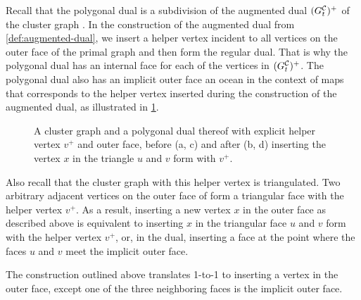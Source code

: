 Recall that the polygonal dual is a subdivision of the augmented dual $(G^\mathcal{C}_{t})^+$ of the cluster graph .
In the construction of the augmented dual from \cref{def:augmented-dual}, we insert a helper vertex incident to all vertices on the outer face of the primal graph and then form the regular dual.
That is why the polygonal dual has an internal face for each of the vertices in $(G^\mathcal{C}_{t})^+$.
The polygonal dual also has an implicit outer face \emdash{} an ocean in the context of maps \emdash{} that corresponds to the helper vertex inserted during the construction of the augmented dual, as illustrated in \cref{fig:insert-vertex-duality}.

\begin{figure}[H]
	\centering
	\quad
	\qquad
	\quad
	\caption{A cluster graph and a polygonal dual thereof with explicit helper vertex $v^+$ and outer face, before (a, c) and after (b, d) inserting the vertex $x$ in the triangle $u$ and $v$ form with $v^+$.}
	\label{fig:insert-vertex-duality}
\end{figure}

Also recall that the cluster graph with this helper vertex is triangulated.
Two arbitrary adjacent vertices on the outer face of  form a triangular face with the helper vertex $v^+$.
As a result, inserting a new vertex $x$ in the outer face as described above is equivalent to inserting $x$ in the triangular face $u$ and $v$ form with the helper vertex $v^+$, or, in the dual, inserting a face at the point where the faces $u$ and $v$ meet the implicit outer face.

The construction outlined above translates 1-to-1 to inserting a vertex in the outer face, except one of the three neighboring faces is the implicit outer face.
